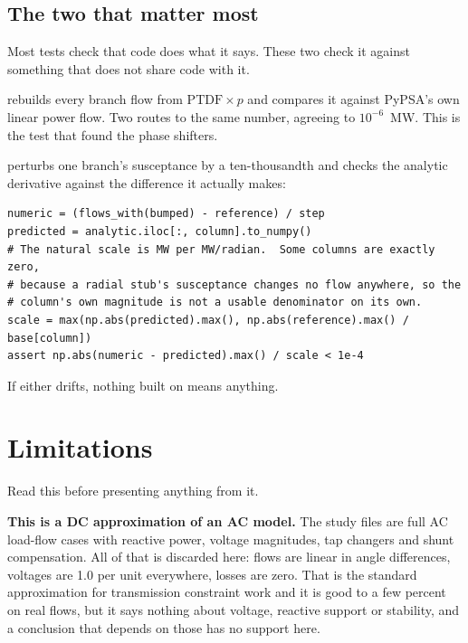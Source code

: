 \documentclass[11pt,a4paper]{article}
\begin{document}
\subsection{The two that matter most}

Most tests check that code does what it says. These two check it against
something that does not share code with it.

 rebuilds every branch flow from
$\mathrm{PTDF}\times p$ and compares it against PyPSA's own linear power flow.
Two routes to the same number, agreeing to $10^{-6}$~MW. This is the test that
found the phase shifters.

 perturbs one branch's
susceptance by a ten-thousandth and checks the analytic derivative against the
difference it actually makes:

\begin{lstlisting}
numeric = (flows_with(bumped) - reference) / step
predicted = analytic.iloc[:, column].to_numpy()
# The natural scale is MW per MW/radian.  Some columns are exactly zero,
# because a radial stub's susceptance changes no flow anywhere, so the
# column's own magnitude is not a usable denominator on its own.
scale = max(np.abs(predicted).max(), np.abs(reference).max() / base[column])
assert np.abs(numeric - predicted).max() / scale < 1e-4
\end{lstlisting}

If either drifts, nothing built on  means anything.

\clearpage
\section{Limitations}

Read this before presenting anything from it.

\textbf{This is a DC approximation of an AC model.} The study files are full AC
load-flow cases with reactive power, voltage magnitudes, tap changers and shunt
compensation. All of that is discarded here: flows are linear in angle
differences, voltages are 1.0 per unit everywhere, losses are zero. That is the
standard approximation for transmission constraint work and it is good to a few
percent on real flows, but it says nothing about voltage, reactive support or
stability, and a conclusion that depends on those has no support here.
\end{document}
